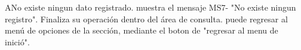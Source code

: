 		\begin{UCtrayectoriaA}{A}{No existe ningun dato registrado.}
			\UCpaso muestra el mensaje MS7- "No existe ningun registro".
			\UCpaso[\UCactor] Finaliza su operación dentro del área de consulta.
			\UCpaso[\UCactor] puede regresar al menú de opciones de la sección, mediante el boton de "regresar al menu de inició".
		\end{UCtrayectoriaA}
	
